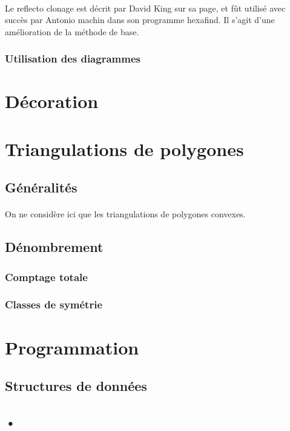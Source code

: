 \documentclass[10pt,a4paper]{article}
\begin{document}
			\paragraph{}Le reflecto clonage est décrit par David King sur sa page, et fût utilisé avec succès par Antonio machin dans son programme hexafind. Il s'agit d'une amélioration de la méthode de base.
			
		\subsubsection{Utilisation des diagrammes}
		
		
	\section{Décoration}
	
	
	
\section{Triangulations de polygones}


	\subsection{Généralités}
		\paragraph{}On ne considère ici que les triangulations de polygones convexes.
			\newtheorem{name}{Printed output}				
		
		
	\subsection{Dénombrement}
	
		\subsubsection{Comptage totale}
		
		\subsubsection{Classes de symétrie}



\section{Programmation}

	\subsection{Structures de données}
	
	\subsection{•}
\end{document}
